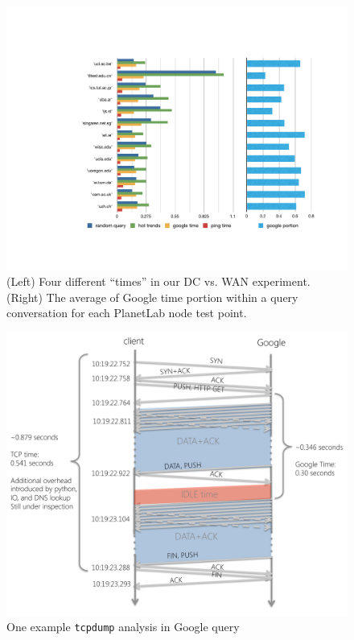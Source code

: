 \begin{figure}[!htb]
  \centering
  \includegraphics[width=\linewidth]{../figs/data_center.pdf}
  \vspace{-1em}
  \caption{(Left) Four different ``times'' in our DC vs. WAN experiment. (Right) The average of Google time portion within a query conversation for each PlanetLab node test point.}
  \label{fig:data_center}
\end{figure}

\begin{figure}
  \centering
  \includegraphics[width=\linewidth]{../figs/tcpdump.pdf}
  \vspace{-1em}
  \caption{One example \texttt{tcpdump} analysis in Google query}
  \label{fig:tcpdump}
\end{figure}

